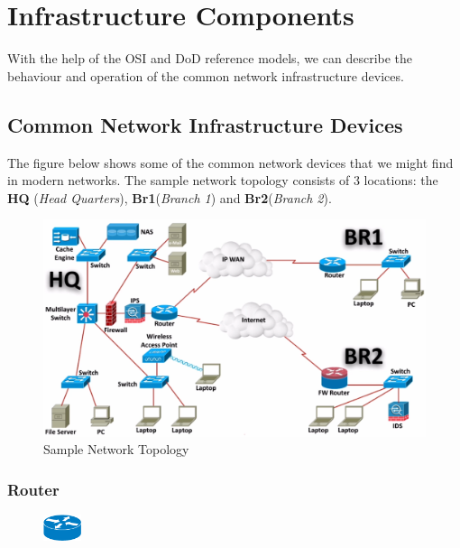 \chapter{Infrastructure Components}
With the help of the OSI and DoD reference models, we can describe the behaviour and operation of the common network infrastructure devices. 

\section{Common Network Infrastructure Devices}
The figure below shows some of the common network devices that we might find in modern networks. The sample network topology consists of 3 locations: the \textbf{HQ} (\textit{Head Quarters}), \textbf{Br1}(\textit{Branch 1}) and \textbf{Br2}(\textit{Branch 2}). 

\begin{figure}[H]
	\centering
	\includegraphics[width=1\linewidth]{"Mod1/chapters/1.2.a Common Network Devices"}
	\caption{Sample Network Topology}
	\label{fig:sample_net_topo}
\end{figure}

\subsection{Router}

\begin{figure}
	\centering
	\vspace{-12pt}
	\includegraphics[width=0.1\textwidth]{"Mod1/chapters/1.2.b Network Icons/1.2.b.1 Router"}
	\vspace{-10pt}
\end{figure}

